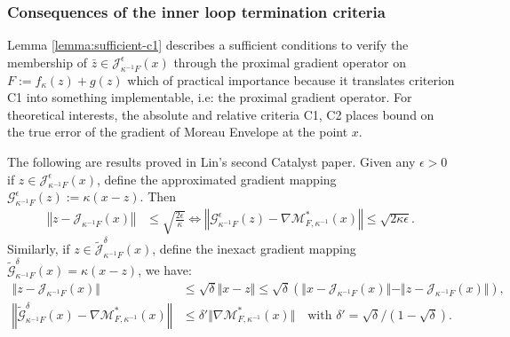 \documentclass[12pt]{article}
\begin{document}
        \subsubsection{Consequences of the inner loop termination criteria}
            Lemma \ref{lemma:sufficient-c1} describes a sufficient conditions to verify the membership of $\bar z \in \mathcal J_{\kappa^{-1}F}^\epsilon (x)$ through the proximal gradient operator on $F:= f_\kappa(z) + g(z)$ which of practical importance because it translates criterion C1 into something implementable, i.e: the proximal gradient operator. 
            For theoretical interests, the absolute and relative criteria C1, C2 places bound on the true error of the gradient of Moreau Envelope at the point $x$. 
            \par 
            The following are results proved in Lin's second Catalyst paper. 
            Given any $\epsilon > 0$ if $z \in \mathcal J_{\kappa^{-1}F}^\epsilon (x)$, define the approximated gradient mapping $\mathcal G_{\kappa^{-1}F}^\epsilon (z) := \kappa(x - z)$.
            Then
            \begin{align*}
                \left\Vert z - \mathcal J_{\kappa^{-1}F} (x)\right\Vert
                &\le \sqrt{\frac{2\epsilon}{\kappa}} 
                \iff 
                \left\Vert
                    \mathcal G_{\kappa^{-1}F}^\epsilon(z) 
                    - \nabla \mathcal M_{F, \kappa^{-1}}^*(x)
                \right\Vert 
                \le \sqrt{2\kappa\epsilon}. 
            \end{align*}
            Similarly, if $z \in \widetilde{\mathcal J}_{\kappa^{-1}F}^\delta(x)$, define the inexact gradient mapping $\widetilde{\mathcal G}_{\kappa^{-1}F}^\delta(x) = \kappa(x - z)$, we have: 
            \begin{align*}
                \Vert z - \mathcal J_{\kappa^{-1}F}(x)\Vert 
                &\le \sqrt{\delta}\Vert x - z\Vert 
                \le \sqrt{\delta}(
                    \Vert x - \mathcal J_{\kappa^{-1}F} (x) \Vert 
                    - \Vert z - \mathcal J_{\kappa^{-1}F} (x) \Vert
                ), 
                \\
                \left\Vert 
                    \widetilde{\mathcal G}_{\kappa^{-1}F}^\delta(x) - 
                    \nabla \mathcal M^*_{F, \kappa^{-1}}(x) 
                \right\Vert
                &\le 
                \delta' \Vert \nabla \mathcal M^*_{F, \kappa^{-1}}(x) \Vert \quad 
                \text{with } \delta' = \sqrt{\delta}/(1 - \sqrt{\delta}). 
            \end{align*}
\end{document}
